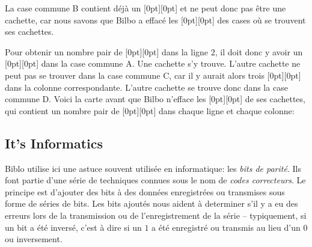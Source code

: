 \documentclass[a4paper,11pt]{report}
\newcommand{\taskGraphicsFolder}{..}
\begin{document}
La case commune B contient déjà un \raisebox{\dimexpr -0.5ex +0.3ex \relax}[0pt][0pt]{} et ne peut donc pas être une cachette, car nous savons que Bilbo a effacé les \raisebox{\dimexpr -0.5ex +0.3ex \relax}[0pt][0pt]{} des cases où se trouvent ses cachettes.

Pour obtenir un nombre pair de \raisebox{\dimexpr -0.5ex +0.3ex \relax}[0pt][0pt]{} dans la ligne $2$, il doit donc y avoir un \raisebox{\dimexpr -0.5ex +0.3ex \relax}[0pt][0pt]{} dans la case commune A. Une cachette s’y trouve. L’autre cachette ne peut pas se trouver dans la case commune C, car il y aurait alors trois \raisebox{\dimexpr -0.5ex +0.3ex \relax}[0pt][0pt]{} dans la colonne correspondante. L’autre cachette se trouve donc dans la case commune D. Voici la carte avant que Bilbo n’efface les \raisebox{\dimexpr -0.5ex +0.3ex \relax}[0pt][0pt]{} de ses cachettes, qui contient un nombre pair de \raisebox{\dimexpr -0.5ex +0.3ex \relax}[0pt][0pt]{} dans chaque ligne et chaque colonne:

{\centering%
\par}


\subsection*{It’s Informatics}

Biblo utilise ici une astuce souvent utilisée en informatique: les \emph{bits de parité}. Ils font partie d’une série de techniques connues sous le nom de \emph{codes correcteurs}. Le principe est d’ajouter des bits à des données enregistrées ou transmises sous forme de séries de bits. Les bits ajoutés nous aident à determiner s’il y a eu des erreurs lors de la transmission ou de l’enregistrement de la série – typiquement, si un bit a été inversé, c’est à dire si un $1$ a été enregistré ou transmis au lieu d’un $0$ ou inversement.
\end{document}
